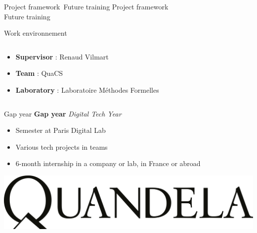 \begin{frame}{Project framework\ Future training}
  \huge{Project framework \\ Future training}
\end{frame}

\begin{frame}{Work environnement}
  \begin{columns}
      \begin{column}{0.6\textwidth}
          \begin{itemize}
              \item \textbf{Supervisor} : Renaud Vilmart
              \item \textbf{Team} : QuaCS
              \item \textbf{Laboratory} : Laboratoire Méthodes Formelles
          \end{itemize}
      \end{column}
      \begin{column}{0.4\textwidth}
          \begin{center}
              
              \vspace{0.5cm}
              
          \end{center}
      \end{column}
  \end{columns}
\end{frame}

\begin{frame}{Gap year}
  \textbf{Gap year} \textit{Digital Tech Year}
  \begin{itemize}
    \item Semester at Paris Digital Lab
    \item Various tech projects in teams
    \item 6-month internship in a company or lab, in France or abroad
  \end{itemize}

  \pause

  \vspace{1em}
  
  \hfill{}
  
  \hfill{}
  \includegraphics[width=.25\textwidth]{./images/quandela-logo.png}
\end{frame}

